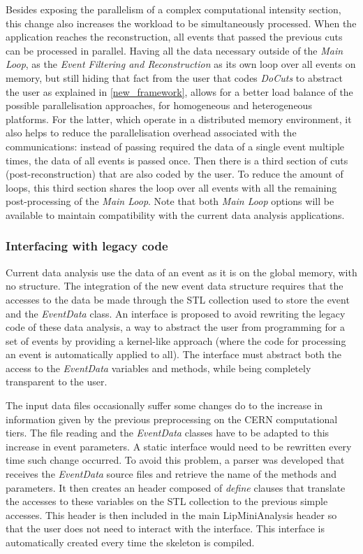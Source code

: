 Besides exposing the parallelism of a complex computational intensity section, this change also increases the workload to be simultaneously processed. When the application reaches the reconstruction, all events that passed the previous cuts can be processed in parallel. Having all the data necessary outside of the \textit{Main Loop}, as the \textit{Event Filtering and Reconstruction} as its own loop over all events on memory, but still hiding that fact from the user that codes \textit{DoCuts} to abstract the user as explained in \ref{new_framework}, allows for a better load balance of the possible parallelisation approaches, for homogeneous and heterogeneous platforms. For the latter, which operate in a distributed memory environment, it also helps to reduce the parallelisation overhead associated with the communications: instead of passing required the data of a single event multiple times, the data of all events is passed once. Then there is a third section of cuts (post-reconstruction) that are also coded by the user. To reduce the amount of loops, this third section shares the loop over all events with all the remaining post-processing of the \textit{Main Loop}. Note that both \textit{Main Loop} options will be available to maintain compatibility with the current data analysis applications.

\subsubsection*{Interfacing with legacy code}

Current data analysis use the data of an event as it is on the global memory, with no structure. The integration of the new event data structure requires that the accesses to the data be made through the STL collection used to store the event and the \textit{EventData} class. An interface is proposed to avoid rewriting the legacy code of these data analysis, a way to abstract the user from programming for a set of events by providing a kernel-like approach (where the code for processing an event is automatically applied to all). The interface must abstract both the access to the \textit{EventData} variables and methods, while being completely transparent to the user.

The input data files occasionally suffer some changes do to the increase in information given by the previous preprocessing on the CERN computational tiers. The file reading and the \textit{EventData} classes have to be adapted to this increase in event parameters. A static interface would need to be rewritten every time such change occurred. To avoid this problem, a parser was developed that receives the \textit{EventData} source files and retrieve the name of the methods and parameters. It then creates an header composed of \textit{define} clauses that translate the accesses to these variables on the STL collection to the previous simple accesses. This header is then included in the main LipMiniAnalysis header so that the user does not need to interact with the interface. This interface is automatically created every time the skeleton is compiled.

